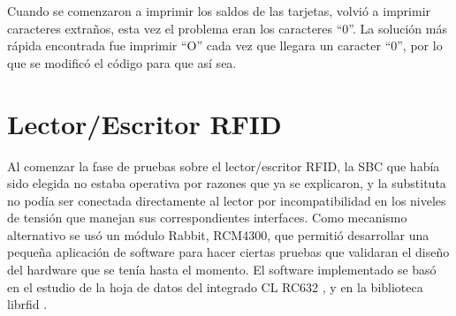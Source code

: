Cuando se comenzaron a imprimir los saldos de las tarjetas, volvió a imprimir caracteres extraños, esta vez el problema eran los caracteres “0”. La solución más rápida encontrada fue imprimir “O” cada vez que llegara un caracter “0”, por lo que se modificó el código para que así sea.


\section{Lector/Escritor RFID}
Al comenzar la fase de pruebas sobre el lector/escritor RFID, la SBC que había sido elegida no estaba operativa por razones que ya se explicaron, y la substituta no podía ser conectada directamente al lector por incompatibilidad en los niveles de tensión que manejan sus correspondientes interfaces. Como mecanismo alternativo se usó un módulo Rabbit, RCM4300, que permitió desarrollar una pequeña aplicación de software para hacer ciertas pruebas que validaran el diseño del hardware que se tenía hasta el momento. El software implementado se basó en el estudio de la hoja de datos del integrado CL RC632 , y en la biblioteca librfid \cite{librfid}. 


